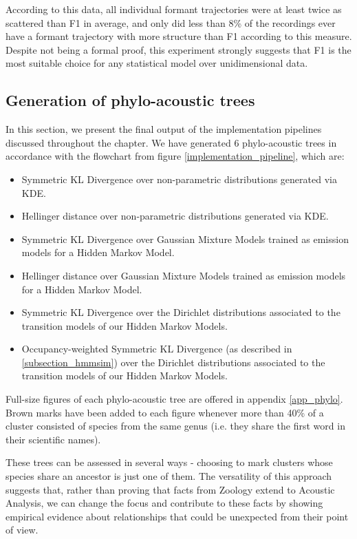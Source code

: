 \documentclass[../main.tex]{subfiles}
\begin{document}
\par According to this data, all individual formant trajectories were at least twice as scattered than F1 in average, and only did less than 8\% of the recordings ever have a formant trajectory with more structure than F1 according to this measure. Despite not being a formal proof, this experiment strongly suggests that F1 is the most suitable choice for any statistical model over unidimensional data.

\subsection{Generation of phylo-acoustic trees} \label{subsection_phylo}
In this section, we present the final output of the implementation pipelines discussed throughout the chapter. We have generated 6 phylo-acoustic trees in accordance with the flowchart from figure \ref{implementation_pipeline}, which are:
\begin{itemize}
\item Symmetric KL Divergence over non-parametric distributions generated via KDE.
\item Hellinger distance over non-parametric distributions generated via KDE.
\item Symmetric KL Divergence over Gaussian Mixture Models trained as emission models for a Hidden Markov Model.
\item Hellinger distance over Gaussian Mixture Models trained as emission models for a Hidden Markov Model.
\item Symmetric KL Divergence over the Dirichlet distributions associated to the transition models of our Hidden Markov Models.
\item Occupancy-weighted Symmetric KL Divergence (as described in \ref{subsection_hmmsim}) over the Dirichlet distributions associated to the transition models of our Hidden Markov Models.
\end{itemize}
\par Full-size figures of each phylo-acoustic tree are offered in appendix \ref{app_phylo}. Brown marks have been added to each figure whenever more than 40\% of a cluster consisted of species from the same genus (i.e. they share the first word in their scientific names). 
\par These trees can be assessed in several ways - choosing to mark clusters whose species share an ancestor is just one of them. The versatility of this approach suggests that, rather than proving that facts from Zoology extend to Acoustic Analysis, we can change the focus and contribute to these facts by showing empirical evidence about relationships that could be unexpected from their point of view.
\end{document}

